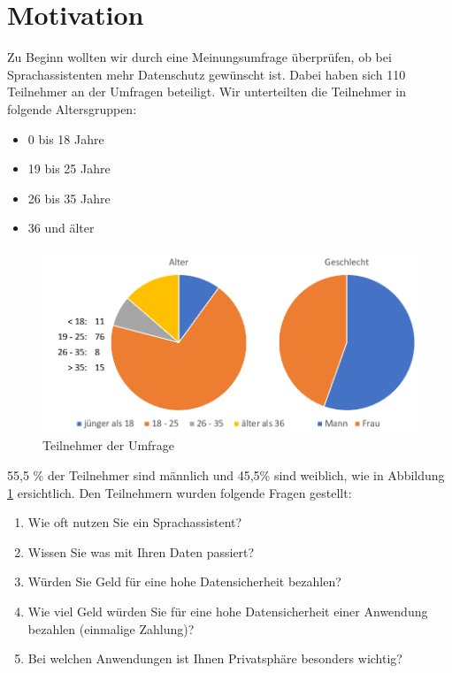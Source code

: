\section{Motivation} \label{umfrage}

Zu Beginn wollten wir durch eine Meinungsumfrage überprüfen, ob bei Sprachassistenten mehr Datenschutz gewünscht ist. Dabei haben sich 110 Teilnehmer an der Umfragen beteiligt. Wir unterteilten die Teilnehmer in folgende Altersgruppen:

\begin{itemize}
	\item 0 bis 18 Jahre 
	\item 19 bis 25 Jahre
	\item 26 bis 35 Jahre
	\item 36 und älter	
\end{itemize}

\begin{figure}[h!]
	\centering
	\includegraphics[width=0.7\linewidth]{Picture/umfrage_teilnehmer}
	\caption[Teilnehmer der Umfrage]{Teilnehmer der Umfrage}
	\label{fig:umfrage_teilnehmer}
\end{figure}

55,5 \% der Teilnehmer sind männlich und 45,5\% sind weiblich, wie in Abbildung \ref{fig:umfrage_teilnehmer} ersichtlich. Den Teilnehmern wurden folgende Fragen gestellt:

\begin{enumerate}
	
	\item Wie oft nutzen Sie ein Sprachassistent?
	\item Wissen Sie was mit Ihren Daten passiert?
	\item Würden Sie Geld für eine hohe Datensicherheit bezahlen?
	\item Wie viel Geld würden Sie für eine hohe Datensicherheit einer Anwendung bezahlen (einmalige Zahlung)?
	\item Bei welchen Anwendungen ist Ihnen Privatsphäre besonders wichtig?
	
\end{enumerate}

